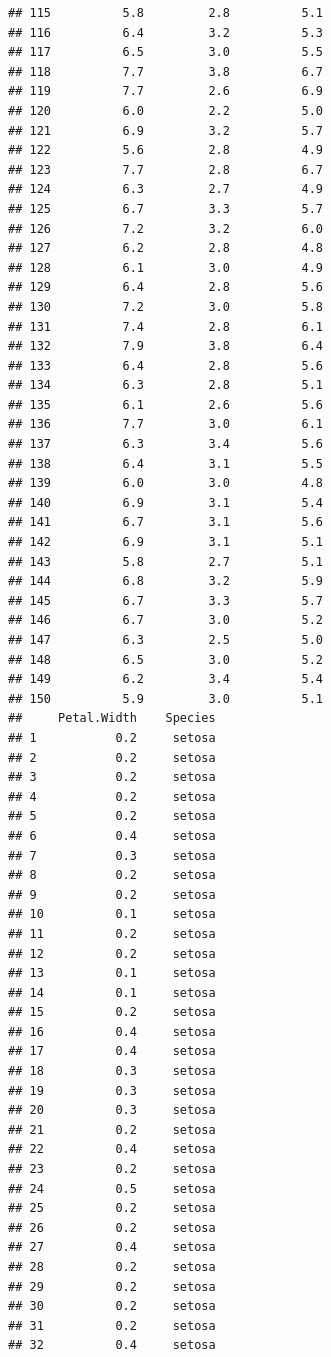 \documentclass[
]{book}
\begin{document}
\begin{verbatim}
## 115          5.8         2.8          5.1
## 116          6.4         3.2          5.3
## 117          6.5         3.0          5.5
## 118          7.7         3.8          6.7
## 119          7.7         2.6          6.9
## 120          6.0         2.2          5.0
## 121          6.9         3.2          5.7
## 122          5.6         2.8          4.9
## 123          7.7         2.8          6.7
## 124          6.3         2.7          4.9
## 125          6.7         3.3          5.7
## 126          7.2         3.2          6.0
## 127          6.2         2.8          4.8
## 128          6.1         3.0          4.9
## 129          6.4         2.8          5.6
## 130          7.2         3.0          5.8
## 131          7.4         2.8          6.1
## 132          7.9         3.8          6.4
## 133          6.4         2.8          5.6
## 134          6.3         2.8          5.1
## 135          6.1         2.6          5.6
## 136          7.7         3.0          6.1
## 137          6.3         3.4          5.6
## 138          6.4         3.1          5.5
## 139          6.0         3.0          4.8
## 140          6.9         3.1          5.4
## 141          6.7         3.1          5.6
## 142          6.9         3.1          5.1
## 143          5.8         2.7          5.1
## 144          6.8         3.2          5.9
## 145          6.7         3.3          5.7
## 146          6.7         3.0          5.2
## 147          6.3         2.5          5.0
## 148          6.5         3.0          5.2
## 149          6.2         3.4          5.4
## 150          5.9         3.0          5.1
##     Petal.Width    Species
## 1           0.2     setosa
## 2           0.2     setosa
## 3           0.2     setosa
## 4           0.2     setosa
## 5           0.2     setosa
## 6           0.4     setosa
## 7           0.3     setosa
## 8           0.2     setosa
## 9           0.2     setosa
## 10          0.1     setosa
## 11          0.2     setosa
## 12          0.2     setosa
## 13          0.1     setosa
## 14          0.1     setosa
## 15          0.2     setosa
## 16          0.4     setosa
## 17          0.4     setosa
## 18          0.3     setosa
## 19          0.3     setosa
## 20          0.3     setosa
## 21          0.2     setosa
## 22          0.4     setosa
## 23          0.2     setosa
## 24          0.5     setosa
## 25          0.2     setosa
## 26          0.2     setosa
## 27          0.4     setosa
## 28          0.2     setosa
## 29          0.2     setosa
## 30          0.2     setosa
## 31          0.2     setosa
## 32          0.4     setosa

\end{verbatim}
\end{document}
